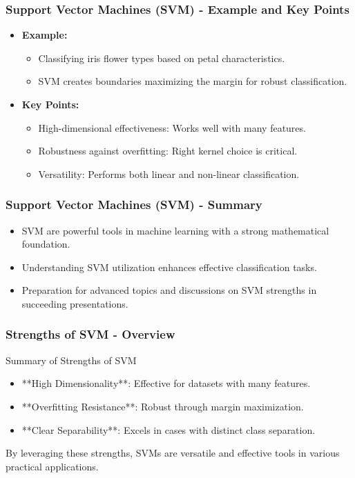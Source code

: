 \documentclass[aspectratio=169]{beamer}
\begin{document}
\begin{frame}[fragile]
    \frametitle{Support Vector Machines (SVM) - Example and Key Points}
    \begin{itemize}
        \item \textbf{Example:} 
        \begin{itemize}
            \item Classifying iris flower types based on petal characteristics.
            \item SVM creates boundaries maximizing the margin for robust classification.
        \end{itemize}

        \item \textbf{Key Points:} 
        \begin{itemize}
            \item High-dimensional effectiveness: Works well with many features.
            \item Robustness against overfitting: Right kernel choice is critical.
            \item Versatility: Performs both linear and non-linear classification.
        \end{itemize}
    \end{itemize}
\end{frame}

\begin{frame}[fragile]
    \frametitle{Support Vector Machines (SVM) - Summary}
    \begin{itemize}
        \item SVM are powerful tools in machine learning with a strong mathematical foundation.
        \item Understanding SVM utilization enhances effective classification tasks.
        \item Preparation for advanced topics and discussions on SVM strengths in succeeding presentations.
    \end{itemize}
\end{frame}

\begin{frame}[fragile]
    \frametitle{Strengths of SVM - Overview}
    \begin{block}{Summary of Strengths of SVM}
        \begin{itemize}
            \item **High Dimensionality**: Effective for datasets with many features.
            \item **Overfitting Resistance**: Robust through margin maximization.
            \item **Clear Separability**: Excels in cases with distinct class separation.
        \end{itemize}
    \end{block}
    By leveraging these strengths, SVMs are versatile and effective tools in various practical applications.
\end{frame}
\end{document}
